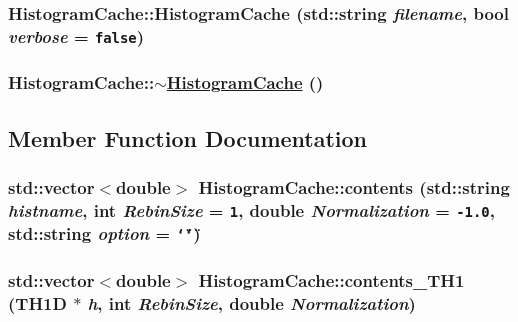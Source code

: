 \hypertarget{classHistogramCache_a1}{
\subsubsection[HistogramCache]{\setlength{\rightskip}{0pt plus 5cm}Histogram\-Cache::Histogram\-Cache (std::string {\em filename}, bool {\em verbose} = {\tt false})}}
\label{classHistogramCache_a1}


\hypertarget{classHistogramCache_a2}{
\subsubsection[$\sim$HistogramCache]{\setlength{\rightskip}{0pt plus 5cm}Histogram\-Cache::$\sim$\hyperlink{classHistogramCache}{Histogram\-Cache} ()}}
\label{classHistogramCache_a2}




\subsection{Member Function Documentation}
\hypertarget{classHistogramCache_a4}{
\subsubsection[contents]{\setlength{\rightskip}{0pt plus 5cm}std::vector$<$double$>$ Histogram\-Cache::contents (std::string {\em histname}, int {\em Rebin\-Size} = {\tt 1}, double {\em Normalization} = {\tt -1.0}, std::string {\em option} = {\tt \char`\"{}\char`\"{}})}}
\label{classHistogramCache_a4}


\hypertarget{classHistogramCache_a5}{
\subsubsection[contents\_\-TH1]{\setlength{\rightskip}{0pt plus 5cm}std::vector$<$double$>$ Histogram\-Cache::contents\_\-TH1 (TH1D $\ast$ {\em h}, int {\em Rebin\-Size}, double {\em Normalization})}}
\label{classHistogramCache_a5}


